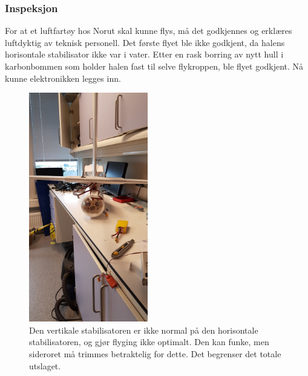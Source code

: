 \documentclass[12pt, a4paper]{article}
\begin{document}
\subsubsection{Inspeksjon}
For at et luftfartøy hos Norut skal kunne flys, må det godkjennes og erklæres luftdyktig av teknisk personell. Det første flyet ble ikke godkjent, da halens horisontale stabilisator ikke var i vater. Etter en rask borring av nytt hull i karbonbommen som holder halen fast til selve flykroppen, ble flyet godkjent. Nå kunne elektronikken legges inn. \\

\begin{figure}[ht]
	\centering

	\includegraphics[width = .5\textwidth, height = 10cm]{bilder/skjev_halefinne.jpg}
	\caption[Skjev stabilisator]{Den vertikale stabilisatoren er ikke normal på den horisontale stabilisatoren, og gjør flyging ikke optimalt. Den kan funke, men sideroret må trimmes betraktelig for dette. Det begrenser det totale utslaget.}



\end{figure}
\end{document}
